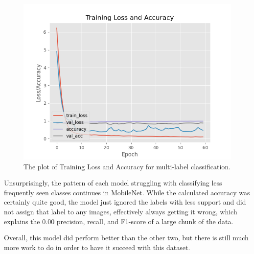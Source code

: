 \documentclass{article}
\theoremstyle{plain}
\theoremstyle{definition}
\theoremstyle{remark}
\begin{document}
\begin{figure}[!h]
    \centering
    \includegraphics[scale=0.5]{final_results}
    \caption{The plot of Training Loss and Accuracy for multi-label classification.}
    \label{fig:trainingloss}
\end{figure}

Unsurprisingly, the pattern of each model struggling with classifying less frequently seen classes
continues in MobileNet. While the calculated accuracy was certainly quite good, the model just
ignored the labels with less support and did not assign that label to any images, effectively always
getting it wrong, which explains the 0.00 precision, recall, and F1-score of a large chunk of the data.

Overall, this model did perform better than the other two, but there is still much more work to do
in order to have it succeed with this dataset.

\end{document}
